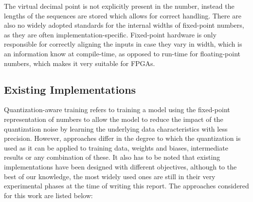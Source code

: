 The virtual decimal point is not explicitly present in the number, instead the lengths of the sequences are stored which allows for correct handling. There are also no widely adopted standards for the internal widths of fixed-point numbers, as they are often implementation-specific. Fixed-point hardware is only responsible for correctly aligning the inputs in case they vary in width, which is an information know at compile-time, as opposed to run-time for floating-point numbers, which makes it very suitable for FPGAs.

\subsection{Existing Implementations}
Quantization-aware training refers to training a model using the fixed-point representation of numbers to allow the model to reduce the impact of the quantization noise by learning the underlying data characteristics with less precision. However, approaches differ in the degree to which the quantization is used as it can be applied to training data, weights and biases, intermediate results or any combination of these. It also has to be noted that existing implementations have been designed with different objectives, although to the best of our knowledge, the most widely used ones are still in their very experimental phases at the time of writing this report. The approaches considered for this work are listed below:

